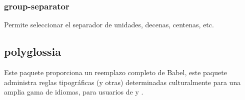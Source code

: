 \documentclass[12pt]{article}
\begin{document}
\subsubsection{group-separator}
Permite seleccionar el separador de unidades, decenas, centenas, etc.\cite{siunitx_param}
\subsection{polyglossia}
Este paquete proporciona un reemplazo completo de Babel, este paquete administra reglas tipográficas (y otras) determinadas culturalmente para una amplia gama de idiomas\cite{babel}, para usuarios de  y .\cite{polyglossia}



\newpage


\end{document}
